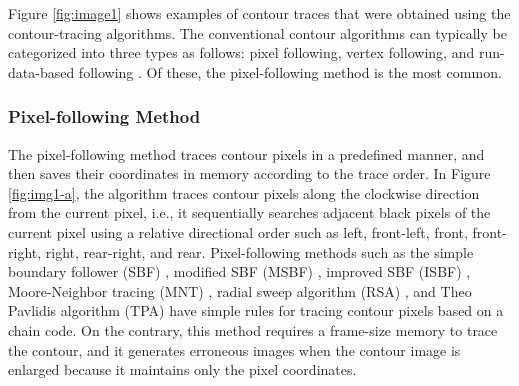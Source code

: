Figure \ref{fig:image1} shows examples of contour traces that were obtained using the contour-tracing algorithms. The conventional contour algorithms can typically be categorized into three types as follows: pixel following, vertex following, and run-data-based following \cite{Miyatake1997Contour,Danielsson1981Improvement,Shoji1999Contour}. Of these, the pixel-following method is the most common.

\subsubsection{Pixel-following Method}


The pixel-following method traces contour pixels in a predefined manner, and then saves their coordinates in memory according to the trace order. In Figure \ref{fig:img1-a}, the algorithm traces contour pixels along the clockwise direction from the current pixel, i.e., it sequentially searches adjacent black pixels of the current pixel using a relative directional order such as left, front-left, front, front-right, right, rear-right, and rear. Pixel-following methods such as the simple boundary follower (SBF) \cite{Pitas2000Digital,Das1990Bivariate,Papert1973Uses}, modified SBF (MSBF) \cite{Gose1996Pattern}, improved SBF (ISBF) \cite{Cheong2006Improved}, Moore-Neighbor tracing (MNT) \cite{Toussaint????Grids}, radial sweep algorithm (RSA) \cite{Mirante1982Radial}, and Theo Pavlidis algorithm (TPA) \cite{Pavlidis2012Algorithms} have simple rules for tracing contour pixels based on a chain code. On the contrary, this method requires a frame-size memory to trace the contour, and it generates erroneous images when the contour image is enlarged \cite{Miyatake1997Contour} because it maintains only the pixel coordinates.

